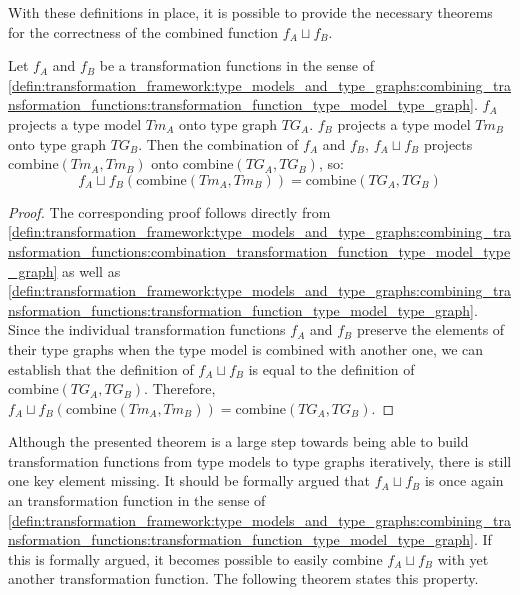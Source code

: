 With these definitions in place, it is possible to provide the necessary theorems for the correctness of the combined function $f_{A} \sqcup f_{B}$.

\begin{thm}
\label{defin:transformation_framework:type_models_and_type_graphs:combining_transformation_functions:tg_combine_mapping_correct}
Let $f_A$ and $f_B$ be a transformation functions in the sense of \cref{defin:transformation_framework:type_models_and_type_graphs:combining_transformation_functions:transformation_function_type_model_type_graph}. $f_A$ projects a type model $Tm_A$ onto type graph $TG_A$. $f_B$ projects a type model $Tm_B$ onto type graph $TG_B$. Then the combination of $f_A$ and $f_B$, $f_{A} \sqcup f_{B}$ projects $\mathrm{combine}(Tm_A, Tm_B)$ onto $\mathrm{combine}(TG_A, TG_B)$, so:
\begin{equation*}
    f_{A} \sqcup f_{B}(\mathrm{combine}(Tm_A, Tm_B)) = \mathrm{combine}(TG_A, TG_B)
\end{equation*}
\end{thm}

\begin{proof}
The corresponding proof follows directly from \cref{defin:transformation_framework:type_models_and_type_graphs:combining_transformation_functions:combination_transformation_function_type_model_type_graph} as well as \cref{defin:transformation_framework:type_models_and_type_graphs:combining_transformation_functions:transformation_function_type_model_type_graph}. Since the individual transformation functions $f_A$ and $f_B$ preserve the elements of their type graphs when the type model is combined with another one, we can establish that the definition of $f_{A} \sqcup f_{B}$ is equal to the definition of $\mathrm{combine}(TG_A, TG_B)$. Therefore, $f_{A} \sqcup f_{B}(\mathrm{combine}(Tm_A, Tm_B)) = \mathrm{combine}(TG_A, TG_B)$.
\end{proof}

Although the presented theorem is a large step towards being able to build transformation functions from type models to type graphs iteratively, there is still one key element missing. It should be formally argued that $f_{A} \sqcup f_{B}$ is once again an transformation function in the sense of \cref{defin:transformation_framework:type_models_and_type_graphs:combining_transformation_functions:transformation_function_type_model_type_graph}. If this is formally argued, it becomes possible to easily combine $f_{A} \sqcup f_{B}$ with yet another transformation function. The following theorem states this property.

